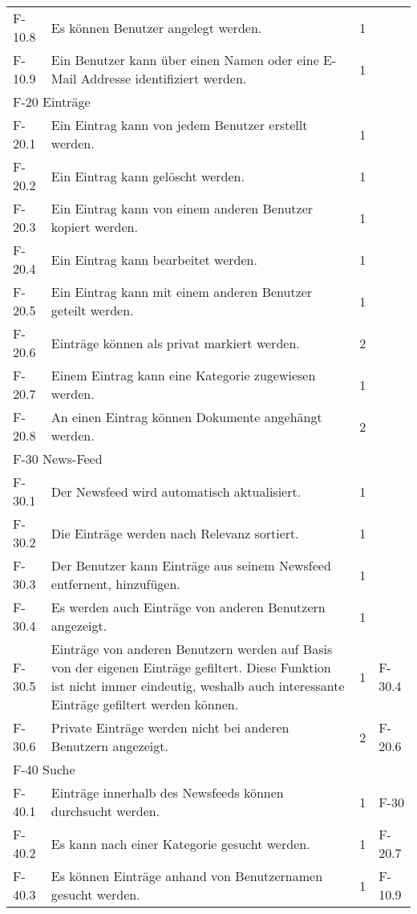 \begin{tabularx}{\textwidth}{|l|X|l|l|}
    F-10.8 & Es können Benutzer angelegt werden. & 1 &\\
    F-10.9 & Ein Benutzer kann über einen Namen oder eine E-Mail Addresse identifiziert werden. & 1 &\\
    \hline
    \multicolumn{4}{|l|}{F-20 Einträge}\\
    \hline
    F-20.1 & Ein Eintrag kann von jedem Benutzer erstellt werden. & 1 & \\
    F-20.2 & Ein Eintrag kann gelöscht werden. & 1 & \\
    F-20.3 & Ein Eintrag kann von einem anderen Benutzer kopiert werden. & 1 & \\
    F-20.4 & Ein Eintrag kann bearbeitet werden. & 1 & \\
    F-20.5 & Ein Eintrag kann mit einem anderen Benutzer geteilt werden. & 1 & \\
    F-20.6 & Einträge können als privat markiert werden. & 2 &\\
    F-20.7 & Einem Eintrag kann eine Kategorie zugewiesen werden. & 1 & \\
    F-20.8 & An einen Eintrag können Dokumente angehängt werden. & 2 & \\
    \hline
    \multicolumn{4}{|l|}{F-30 News-Feed}\\
    \hline
    F-30.1 & Der Newsfeed wird automatisch aktualisiert. & 1 & \\
    F-30.2 & Die Einträge werden nach Relevanz sortiert. & 1 & \\
    F-30.3 & Der Benutzer kann Einträge aus seinem Newsfeed entfernent, hinzufügen. & 1 & \\
    F-30.4 & Es werden auch Einträge von anderen Benutzern angezeigt. & 1 & \\
    F-30.5 & Einträge von anderen Benutzern werden auf Basis von der eigenen Einträge gefiltert. Diese Funktion ist nicht immer eindeutig, weshalb auch interessante Einträge gefiltert werden können. & 1 & F-30.4\\
    F-30.6 & Private Einträge werden nicht bei anderen Benutzern angezeigt. & 2 & F-20.6\\
    \hline
    \multicolumn{4}{|l|}{F-40 Suche}\\
    \hline
    F-40.1 & Einträge innerhalb des Newsfeeds können durchsucht werden. & 1 & F-30\\
    F-40.2 & Es kann nach einer Kategorie gesucht werden. & 1 & F-20.7\\
    F-40.3 & Es können Einträge anhand von Benutzernamen gesucht werden. & 1 & F-10.9\\

\end{tabularx}
